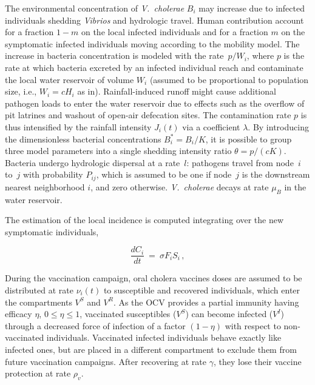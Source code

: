 The environmental concentration of \textit{V.~cholerae} $B_i$ may increase due to  infected individuals shedding \textit{Vibrios} and hydrologic travel. Human contribution account for a fraction $1-m$ on the local infected individuals and for a fraction $m$ on the symptomatic infected individuals moving according to the mobility model. The increase in bacteria concentration is modeled with the rate~$p/W_i$, where $p$ is the rate at which bacteria excreted by an infected individual reach and contaminate the local water reservoir of volume $W_i$ (assumed to be proportional to population size, i.e., $W_i=c H_i$ as in\textcite{Rinaldo:Reassessment20102011:2012}). Rainfall-induced runoff might cause additional pathogen loads to enter the water reservoir due to effects such as the overflow of pit latrines and washout of open-air defecation sites. The contamination rate $p$ is thus intensified by the rainfall intensity $J_i(t)$ via a coefficient $\lambda$\cite{Rinaldo:Reassessment20102011:2012,Righetto:RainfallMediationsSpreading:2013}. By introducing the dimensionless bacterial concentrations $B_i^*=B_i/K$,  it is possible to group three model parameters into a single shedding intensity ratio $\theta=p/(cK)$\cite{Bertuzzo:SpacetimeEvolutionCholera:2008}. Bacteria undergo hydrologic dispersal at a rate~$l$: pathogens travel from node~$i$ to~$j$ with probability $P_{ij}$, which is assumed to be one if node~$j$ is the downstream nearest neighborhood $i$, and zero otherwise. \textit{V.~cholerae} decays at rate $\mu_B$ in the water reservoir.

The estimation of the local incidence is computed integrating over the new symptomatic individuals,

\begin{equation}
\frac{d C_i}{dt} \ = \ \sigma F_i S_i  \, , \label{eq:C}
\end{equation}

During the vaccination campaign, oral cholera vaccines doses are assumed to be distributed at rate $\nu_i(t)$ to susceptible and recovered individuals, which enter the compartments $V^S$ and $V^R$. As the OCV provides a partial immunity having efficacy $\eta$, $0\leq \eta \leq 1$, vaccinated susceptibles ($V^S$) can become infected ($V^I$) through a decreased force of infection of a factor $(1-\eta)$ with respect to non-vaccinated individuals. Vaccinated infected individuals behave exactly like infected ones, but are placed in a different compartment to exclude them from future vaccination campaigns. After recovering at rate $\gamma$, they lose their vaccine protection at rate $\rho_{v}$.


